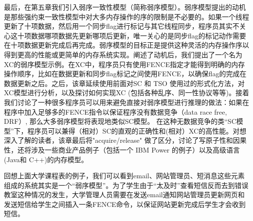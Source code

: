 \documentclass[UTF-8]{ctexrep}
\begin{document}
\par 最后，在第五章我们引入弱序一致性模型（简称弱序模型）。弱序模型提出的动机是那些强约束一致性模型中对大多内存操作的序的限制是不必要的。如果一个线程更新了十项数据，然后用一个同步flag进行标记与其它线程同步，程序员其实不关心这十项数据哪项数据先更新哪项后更新，唯一关心的是同步flag的标记动作需要在十项数据更新完成后再完成。弱序模型的目标正是提供这种灵活的内存操作序以得到更高的性能或更简单的内存系统实现。阐述了动机后，我们提出了一个名为XC的弱序模型示例。在XC中，程序员只有使用FENCE指定才能得到明确的内存操作顺序，比如在数据更新和同步flag标记之间使用FENCE，以确保flag的完成在数据更新之后。之后，该章延续使用前面对SC 和 TSO 使用过的形式化方法，对XC模型进行分析，以及探讨如何实现XC (包括各种乱序、同一性协议等等)。接着我们讨论了一种很多程序员可以用来避免直接对弱序模型进行推理的做法：如果在程序中加入足够多的FENCE指令以保证程序没有数据竞争（data race free, DRF）, 那么大多弱序模型将表现地类似SC模型。 在这种无数据竞争的类“SC模型”下，程序员可以兼得（相对）SC的直观的正确性和(相对）XC的高性能。对想深入了解的读者，该章最后将"acquire/release" 做了区分，讨论了写原子性和因果性，还将涉及一些商业产品例子（包括一个 IBM Power 的例子）以及高级语言(Java和 C++)的内存模型。
\par 回想上面大学课程表的例子，我们可以看到email、网站管理员、短消息这些元素组成的系统其实是一个“弱序模型”。为了学生由于“太及时”查看短信反而去到错误教室这种情况的发生，大学管理人员需要在发送email通知网站管理员更新网页和发送短信给学生之间插入一条FENCE命令，以保证网站更新完成后学生才会收到短信。
\end{document}
